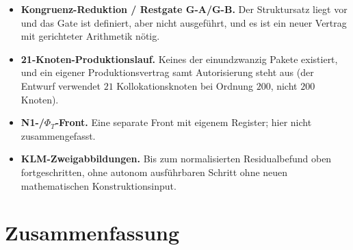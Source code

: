 \documentclass[12pt,a4paper]{article}
\theoremstyle{definition}
\theoremstyle{remark}
\begin{document}
\begin{itemize}
  \item \textbf{Kongruenz-Reduktion / Restgate G-A/G-B.} Der Struktursatz
    liegt vor und das Gate ist definiert, aber nicht ausgeführt, und es ist
    ein neuer Vertrag mit gerichteter Arithmetik nötig.
  \item \textbf{21-Knoten-Produktionslauf.} Keines der einundzwanzig
    Pakete existiert, und ein eigener Produktionsvertrag samt Autorisierung
    steht aus (der Entwurf verwendet $21$ Kollokationsknoten bei Ordnung
    $200$, nicht $200$ Knoten).
  \item \textbf{N1-/$\Phi_T$-Front.} Eine separate Front mit eigenem
    Register; hier nicht zusammengefasst.
  \item \textbf{KLM-Zweigabbildungen.} Bis zum normalisierten
    Residualbefund oben fortgeschritten, ohne autonom ausführbaren Schritt
    ohne neuen mathematischen Konstruktionsinput.
\end{itemize}


\section{Zusammenfassung}
\label{sec:summary}
\end{document}
